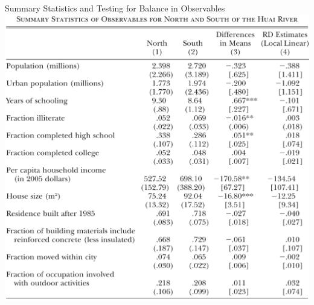 \documentclass{beamer}
\begin{document}
\begin{frame}[label=balancetest]{Summary Statistics and Testing for Balance in Observables}
	\centering
	\includegraphics[scale=0.35]{table2.png}
\end{frame}

\end{document}
